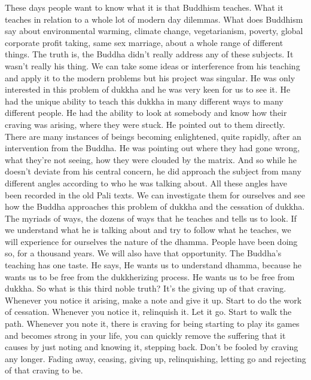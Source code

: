\documentclass[letterpaper,10pt,english]{sphinxmanual}
\begin{document}
\sphinxAtStartPar
These  days  people  want  to  know  what  it  is  that  Buddhism  teaches.
What  it  teaches  in  relation  to  a  whole  lot  of  modern  day  dilemmas. What
does  Buddhism  say  about  environmental  warming,  climate  change,  vegetarianism, poverty, global corporate profit taking, same sex marriage, about
  a  whole  range  of  different  things.  The  truth  is,  the  Buddha  didn’t  really
address any of these subjects. It wasn’t really his thing. We can take some
ideas  or  interference  from  his  teaching  and  apply  it  to  the  modern  problems but his project was singular. He was only interested in this problem of
dukkha and he was very keen for us to see it. He had the unique ability to
teach this dukkha in many different ways to many different people. He had
the  ability  to  look  at  somebody  and  know  how  their  craving  was  arising,
where  they  were  stuck.  He  pointed  out  to  them  directly.  There  are  many
instances of beings becoming enlightened, quite rapidly, after an intervention  from  the  Buddha.  He  was  pointing  out  where  they  had  gone  wrong,
what they’re not seeing, how they were clouded by the matrix. And so while
he  doesn’t  deviate  from  his  central  concern,  he  did  approach  the  subject
from many different angles according to who he was talking about. All these
angles have been recorded in the old Pali texts. We can investigate them for
ourselves and see how the Buddha approaches this problem of dukkha and
the cessation of dukkha. The myriads of ways, the dozens of ways that he
teaches and tells us to look. If we understand what he is talking about and try
to follow what he teaches, we will experience for ourselves the nature of the
dhamma. People have been doing so, for a thousand years. We will also have
that opportunity. The Buddha’s teaching has one taste. He says,
He wants us to understand dhamma, because he wants us to
be free from the dukkherizing process. He wants us to be free from dukkha.
So  what  is  this  third  noble  truth?
It’s the giving up of that craving. Whenever you
notice it arising, make a note and give it up. Start to do the work of cessation. Whenever you notice it, relinquish it. Let it go. Start to walk the path.
Whenever you note it, there is craving for being starting to play its games
and becomes strong in your life, you can quickly remove the suffering that
it causes by just noting and knowing it, stepping back. Don’t be fooled by
craving any longer. Fading away, ceasing, giving up, relinquishing, letting
go and rejecting of that craving to be.
\end{document}
